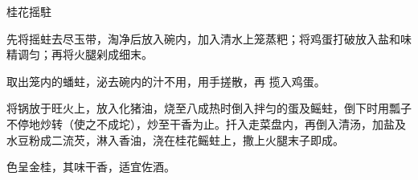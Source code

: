 \begin{recipe}{桂花摇駐}

\ingredients


\cooking

\step 先将摇蛀去尽玉带，淘净后放入碗内，加入清水上笼蒸粑；将鸡蛋打破放入盐和味精调匀；再将火腿剁成细末。

取出笼内的蟠蛀，泌去碗内的汁不用，用手搓散，再 揽入鸡蛋。

\step 将锅放于旺火上，放入化猪油，烧至八成热时倒入拌匀的蛋及鳐蛀，倒下时用瓢子不停地炒转（使之不成坨），炒至干香为止。扦入走菜盘内，再倒入清汤，加盐及水豆粉成二流芡，淋入香油，浇在桂花鳐蛀上，撒上火腿末子即成。

\notes

色呈金桂，其味干香，适宜佐酒。

\end{recipe}

